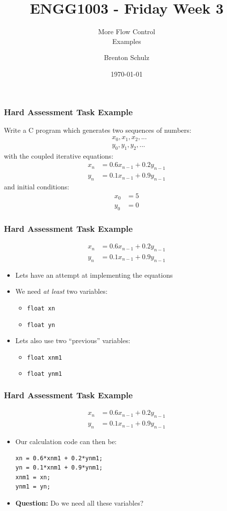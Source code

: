 \documentclass[14pt]{beamer}
\title{ENGG1003 - Friday Week 3}
\subtitle{More Flow Control\\Examples}
\author{Brenton Schulz}
\institute{University of Newcastle}
\date{\today}
\begin{document}
\titlepage


\begin{frame}[fragile]
\frametitle{Hard Assessment Task Example}
{\small Write a C program which generates two sequences of numbers:
\begin{align*}
& x_0, x_1, x_2, ...\\
& y_0, y_1, y_2, ...
\end{align*}
with the coupled iterative equations:
\begin{align*}
x_n &= 0.6x_{n-1} + 0.2y_{n-1}\\
y_n &= 0.1x_{n-1} + 0.9y_{n-1}
\end{align*}
and initial conditions:
\begin{align*}
x_0 &= 5\\
y_0 &= 0
\end{align*}
}
\end{frame}

\begin{frame}
\frametitle{Hard Assessment Task Example}
\begin{align*}
x_n &= 0.6x_{n-1} + 0.2y_{n-1}\\
y_n &= 0.1x_{n-1} + 0.9y_{n-1}
\end{align*}
\vspace{-6mm}
\begin{itemize}
\item Lets have an attempt at implementing the equations
\item We need \textit{at least} two variables:
	\begin{itemize}
		\item \texttt{float xn}
		\item \texttt{float yn}
	\end{itemize}
\item Lets also use two ``previous'' variables:
	\begin{itemize}
		\item \texttt{float xnm1}
		\item \texttt{float ynm1}
	\end{itemize}	
\end{itemize}
\end{frame}

\begin{frame}[fragile]
\frametitle{Hard Assessment Task Example}
\begin{align*}
x_n &= 0.6x_{n-1} + 0.2y_{n-1}\\
y_n &= 0.1x_{n-1} + 0.9y_{n-1}
\end{align*}
\vspace{-6mm}
\begin{itemize}
\item Our calculation code can then be:
\begin{lstlisting}[style=CStyle]
xn = 0.6*xnm1 + 0.2*ynm1;
yn = 0.1*xnm1 + 0.9*ynm1;
xnm1 = xn;
ynm1 = yn;
\end{lstlisting}
\item \textbf{Question:} Do we need all these variables?
\end{itemize}
\end{frame}
\end{document}
